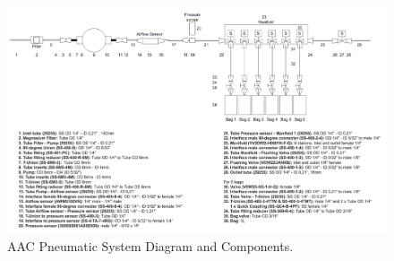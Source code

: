 

\begin{landscape}
\begin{figure}
    \centering
    \includegraphics[width=1.45\textwidth,height=\textheight]{4-experiment-design/img/Mechanical/AAC_System.png}
    \caption{AAC Pneumatic System Diagram and Components.}
    \label{pneumatic_system}
\end{figure}
\end{landscape}

